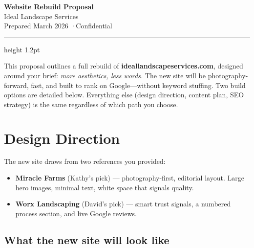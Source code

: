 \documentclass[11pt, letterpaper]{article}
\begin{document}

\begin{center}
  {\LARGE\bfseries\color{black} Website Rebuild Proposal}\\[4pt]
  {\large\color{darkgray} Ideal Landscape Services}\\[6pt]
  {\small\color{midgray} Prepared March 2026 \quad·\quad Confidential}
\end{center}

\vspace{4pt}
{\color{accent}\hrule height 1.2pt}
\vspace{12pt}

This proposal outlines a full rebuild of \textbf{ideallandscapeservices.com},
designed around your brief: \emph{more aesthetics, less words.} The new site
will be photography-forward, fast, and built to rank on Google---without
keyword stuffing. Two build options are detailed below. Everything else
(design direction, content plan, SEO strategy) is the same regardless of
which path you choose.

\section{Design Direction}

The new site draws from two references you provided:

\begin{itemize}
  \item \textbf{Miracle Farms} (Kathy's pick) --- photography-first, editorial
        layout. Large hero images, minimal text, white space that signals quality.
  \item \textbf{Worx Landscaping} (David's pick) --- smart trust signals, a
        numbered process section, and live Google reviews.
\end{itemize}

\subsection*{What the new site will look like}
\end{document}
